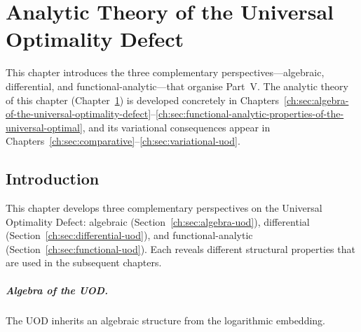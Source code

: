 \chapter[Analytic Theory]{Analytic Theory of the Universal Optimality Defect}\label{ch:sec:analytic-uod}


This chapter introduces the three complementary perspectives---algebraic, differential, and functional-analytic---that organise Part~V. The analytic theory of this chapter (Chapter~\ref{ch:sec:analytic-uod}) is developed concretely in Chapters~\ref{ch:sec:algebra-of-the-universal-optimality-defect}--\ref{ch:sec:functional-analytic-properties-of-the-universal-optimal}, and its variational consequences appear in Chapters~\ref{ch:sec:comparative}--\ref{ch:sec:variational-uod}.


\section{Introduction}\label{ch:sec:introduction-analytic_uod}

This chapter develops three complementary perspectives on the Universal
Optimality Defect: algebraic (Section~\ref{ch:sec:algebra-uod}), differential (Section~\ref{ch:sec:differential-uod}), and
functional-analytic (Section~\ref{ch:sec:functional-uod}).  Each reveals different structural
properties that are used in the subsequent chapters.

\paragraph{Algebra of the UOD.}
The UOD inherits an algebraic structure from the logarithmic embedding.
\label{ch:sec:algebra-uod}


